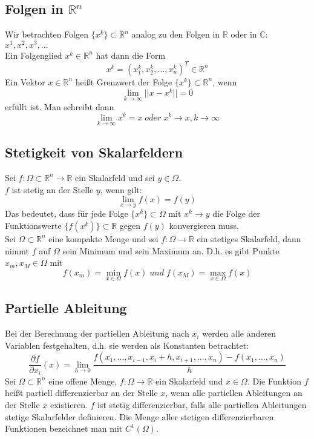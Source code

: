 \documentclass[a4paper,twocolumn,10pt]{article}
\begin{document}
\subsection{Folgen in $\mathbb{R}^n$}
Wir betrachten Folgen $\{x^k\}\subset\mathbb{R}^n$ analog zu den Folgen in $\mathbb{R}$ oder in $\mathbb{C}$: $x^1,x^2,x^3,...$\\
Ein Folgenglied $x^k\in\mathbb{R}^n$ hat dann die Form
\begin{equation*}
x^k=(x_1^k,x_2^k,...,x_n^k)^T \in\mathbb{R}^n
\end{equation*}
Ein Vektor $x\in\mathbb{R}^n$ heißt Grenzwert der Folge $\{x^k\}\subset\mathbb{R}^n$, wenn
\begin{equation*}
\lim\limits_{k\rightarrow\infty}||x-x^k|| =0
\end{equation*}
erfüllt ist. Man schreibt dann
\begin{equation*}
\lim\limits_{k\rightarrow\infty}x^k=x\;oder\;x^k\rightarrow x, k\rightarrow\infty
\end{equation*}

\subsection{Stetigkeit von Skalarfeldern}
Sei $f:\Omega\subset\mathbb{R}^n\rightarrow\mathbb{R}$ ein Skalarfeld und sei $y\in\Omega$.\\
$f$ ist stetig an der Stelle $y$, wenn gilt:
\begin{equation*}
\lim\limits_{x\rightarrow y}f(x)=f(y)
\end{equation*}
Das bedeutet, dass für jede Folge $\{x^k\}\subset\Omega$ mit $x^k\rightarrow y$ die Folge der Funktionswerte $\{f(x^k)\}\subset\mathbb{R}$ gegen $f(y)$ konvergieren muss.\\
Sei $\Omega\subset\mathbb{R}^n$ eine kompakte Menge und sei $f:\Omega\rightarrow\mathbb{R}$ ein stetiges Skalarfeld, dann nimmt $f$ auf $\Omega$ sein Minimum und sein Maximum an. D.h. es gibt Punkte $x_m,x_M\in\Omega$ mit
\begin{equation*}
f(x_m)=\min\limits_{x\in\Omega}f(x)\;und\;f(x_M)=\max\limits_{x\in\Omega}f(x)
\end{equation*}

\subsection{Partielle Ableitung}
Bei der Berechnung der partiellen Ableitung nach $x_i$ werden alle anderen Variablen festgehalten, d.h. sie werden als Konstanten betrachtet:
\begin{equation*}
\frac{\partial f}{\partial x_i}(x)=\lim\limits_{h\rightarrow 0}\frac{f(x_1,...,x_{i-1},x_i+h,x_{i+1},...,x_n)-f(x_1,...,x_n)}{h}
\end{equation*}
Sei $\Omega\subset\mathbb{R}^n$ eine offene Menge, $f:\Omega\rightarrow\mathbb{R}$ ein Skalarfeld und $x\in\Omega$. Die Funktion $f$ heißt partiell differenzierbar an der Stelle $x$, wenn alle partiellen Ableitungen an der Stelle $x$ existieren. $f$ ist stetig differenzierbar, falls alle partiellen Ableitungen stetige Skalarfelder definieren. Die Menge aller stetigen differenzierbaren Funktionen bezeichnet man mit $C^1(\Omega)$.
\end{document}
